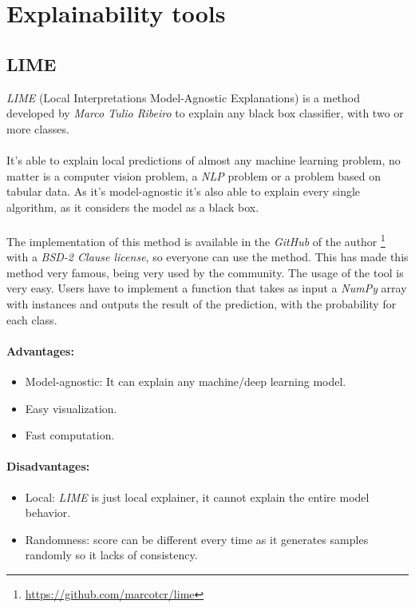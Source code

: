 \section{Explainability tools}
\label{sec:tools}
\noindent 
\subsection{LIME}
\label{sec:Lime}
\noindent \emph{LIME} (Local Interpretations Model-Agnostic Explanations) is a method developed by \emph{Marco Tulio Ribeiro} to explain any black box classifier, with two or more classes.
\paragraph{}
It's able to explain local predictions of almost any machine learning problem, no matter is a computer vision problem, a \emph{NLP} problem or a problem based on tabular data. As it's model-agnostic it's also able to explain every single algorithm, as it considers the model as a black box. 
\paragraph{}
The implementation of this method is available in the \emph{GitHub} of the author \footnote{\url{https://github.com/marcotcr/lime}} with a \emph{BSD-2 Clause license}, so everyone can use the method. This has made this method very famous, being very used by the community. 
The usage of the tool is very easy. Users have to implement a function that takes as input a \emph{NumPy} array with instances and outputs the result of the prediction, with the probability for each class.
 
\paragraph{Advantages:}
\begin{itemize}
	\item Model-agnostic: It can explain any machine/deep learning model.
	\item Easy visualization.
	\item Fast computation.
\end{itemize}
\paragraph{Disadvantages:}
\begin{itemize}
	\item Local: \emph{LIME} is just local explainer, it cannot explain the entire model behavior.
	\item Randomness: score can be different every time as it generates samples randomly so it lacks of consistency.
\end{itemize}

